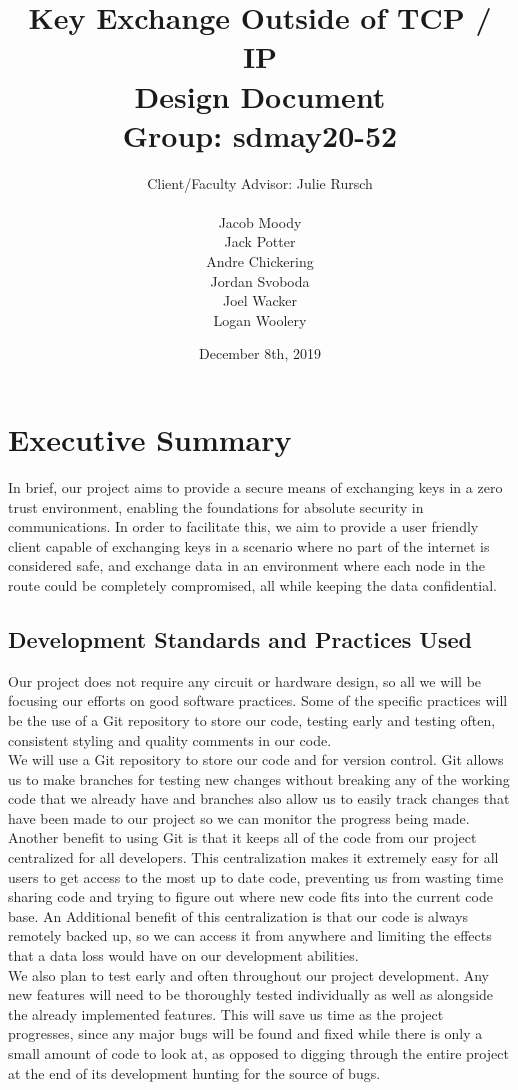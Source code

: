 \documentclass[11pt]{article}
\title{\textbf{Key Exchange Outside of TCP / IP}\\ 
{\normalsize Design Document} \\
{\normalsize Group: sdmay20-52}}
\author{Client/Faculty Advisor: Julie Rursch\\
\\
		Jacob Moody\\
		Jack Potter\\
		Andre Chickering\\
		Jordan Svoboda\\
		Joel Wacker\\
		Logan Woolery
}
\date{December 8th, 2019}
\begin{document}
\maketitle
\newpage
\section*{Executive Summary}

In brief, our project aims to provide a secure means of exchanging keys in a zero trust environment, enabling the foundations for absolute security in communications. In order to facilitate this, we aim to provide a user friendly client capable of exchanging keys in a scenario where no part of the internet is considered safe, and exchange data in an environment where each node in the route could be completely compromised, all while keeping the data confidential.

\subsection*{Development Standards and Practices Used}
Our project does not require any circuit or hardware design, so all we will be focusing our efforts on good software practices. Some of the specific practices will be the use of a Git repository to store our code, testing early and testing often, consistent styling and quality comments in our code. \\

We will use a Git repository to store our code and for version control. Git allows us to make branches for testing new changes without breaking any of the working code that we already have and branches also allow us to easily track changes that have been made to our project so we can monitor the progress being made. Another benefit to using Git is that it keeps all of the code from our project centralized for all developers. This centralization makes it extremely easy for all users to get access to the most up to date code, preventing us from wasting time sharing code and trying to figure out where new code fits into the current code base. An Additional benefit of this centralization is that our code is always remotely backed up, so we can access it from anywhere and limiting the effects that a data loss would have on our development abilities. \\

We also plan to test early and often throughout our project development. Any new features will need to be thoroughly tested individually as well as alongside the already implemented features. This will save us time as the project progresses, since any major bugs will be found and fixed while there is only a small amount of code to look at, as opposed to digging through the entire project at the end of its development hunting for the source of bugs. \\
\end{document}
